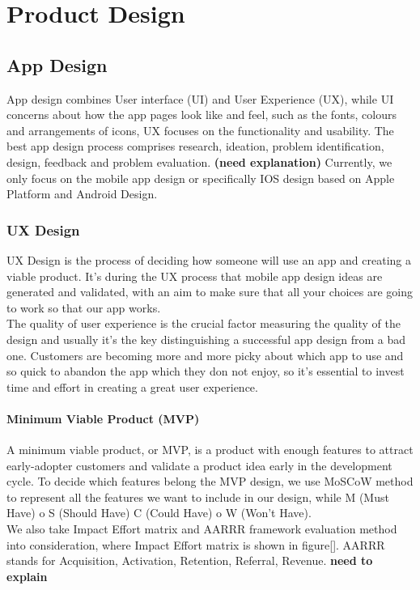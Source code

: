 
\chapter{Product Design} %

\label{Chapter2} %

\section{App Design}
App design combines User interface (UI) and User Experience (UX), while UI concerns about how the app pages look like and feel, such as the fonts, colours and arrangements of icons, UX focuses on the functionality and usability. The best app design process comprises research, ideation, problem identification, design, feedback and problem evaluation. \textbf{(need explanation)} Currently, we only focus on the mobile app design or specifically IOS design based on Apple Platform and Android Design. 

\subsection{UX Design}
UX Design is the process of deciding how someone will use an app and creating a viable product. It’s during the UX process that mobile app design ideas are generated and validated, with an aim to make sure that all your choices are going to work so that our app works. 
\\The quality of user experience is the crucial factor measuring the quality of the design and usually it's the key distinguishing a successful app design from a bad one. Customers are becoming more and more picky about which app to use and so quick to abandon the app which they don not enjoy, so it's essential to invest time and effort in creating a great user experience.
\subsubsection{Minimum Viable Product (MVP)}
A minimum viable product, or MVP, is a product with enough features to attract early-adopter customers and validate a product idea early in the development cycle. To decide which features belong the MVP design, we use MoSCoW method to represent all the features we want to include in our design, while M (Must Have) o S (Should Have) C (Could Have) o W (Won’t Have). 
\\We also take Impact Effort matrix and AARRR framework evaluation method into consideration, where Impact Effort matrix is shown in figure[]. AARRR stands for Acquisition, Activation, Retention, Referral, Revenue. \textbf{need to explain}

